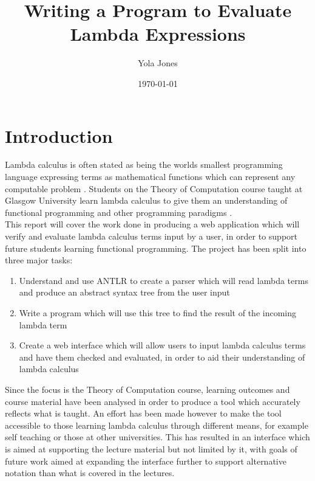 \documentclass[a4paper,11pt]{report}
\begin{document}
\title{Writing a Program to Evaluate Lambda Expressions}
\author{Yola Jones}
\date{\today}
\maketitle

%
%
\renewcommand{\cleardoublepage}{}
\renewcommand{\clearpage}{}
\chapter{Introduction}
Lambda calculus is often stated as being the worlds smallest programming language \cite{Michaelson2011} expressing terms as mathematical functions which can represent any computable problem \cite{Selinger2013}. Students on the Theory of Computation course taught at Glasgow University learn lambda calculus to give them an understanding of functional programming and other programming paradigms \cite{CourseSpecification}.\\

This report will cover the work done in producing a web application which will verify and evaluate lambda calculus terms input by a user, in order to support future students learning functional programming. The project has been split into three major tasks:

\begin{enumerate}
	\item Understand and use ANTLR to create a parser which will read lambda terms and produce an abstract syntax tree from the user input
	\item Write a program which will use this tree to find the result of the incoming lambda term
	\item Create a web interface which will allow users to input lambda calculus terms and have them checked and evaluated, in order to aid their understanding of lambda calculus
\end{enumerate}

Since the focus is the Theory of Computation course, learning outcomes and course material have been analysed in order to produce a tool which accurately reflects what is taught. An effort has been made however to make the tool accessible to those learning lambda calculus through different means, for example self teaching or those at other universities. This has resulted in an interface which is aimed at supporting the lecture material but not limited by it, with goals of future work aimed at expanding the interface further to support alternative notation than what is covered in the lectures.\\
\end{document}
